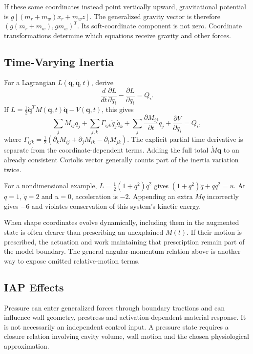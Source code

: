If these same coordinates instead point vertically upward, gravitational potential is $g[(m_r+m_w)x_r+m_wz]$. The generalized gravity vector is therefore $(g(m_r+m_w),gm_w)^T$. Its soft-coordinate component is not zero. Coordinate transformations determine which equations receive gravity and other forces.

\subsection{Time-Varying Inertia}

For a Lagrangian $L(\mathbf q,\dot{\mathbf q},t)$, derive
\[
\frac{d}{dt}\frac{\partial L}{\partial\dot q_i}
-\frac{\partial L}{\partial q_i}=Q_i.
\]
If $L=\tfrac12\dot{\mathbf q}^TM(\mathbf q,t)\dot{\mathbf q}-V(\mathbf q,t)$, this gives
\[
\sum_j M_{ij}\ddot q_j
+\sum_{j,k}\Gamma_{ijk}\dot q_j\dot q_k
+\sum_j\frac{\partial M_{ij}}{\partial t}\dot q_j
+\frac{\partial V}{\partial q_i}=Q_i,
\]
where $\Gamma_{ijk}=\tfrac12(\partial_kM_{ij}+\partial_jM_{ik}-\partial_iM_{jk})$. The explicit partial time derivative is separate from the coordinate-dependent terms. Adding the full total $\dot M\dot{\mathbf q}$ to an already consistent Coriolis vector generally counts part of the inertia variation twice.

For a nondimensional example, $L=\tfrac12(1+q^2)\dot q^2$ gives $(1+q^2)\ddot q+q\dot q^2=u$. At $q=1$, $\dot q=2$ and $u=0$, acceleration is $-2$. Appending an extra $\dot M\dot q$ incorrectly gives $-6$ and violates conservation of this system's kinetic energy.

When shape coordinates evolve dynamically, including them in the augmented state is often clearer than prescribing an unexplained $M(t)$. If their motion is prescribed, the actuation and work maintaining that prescription remain part of the model boundary. The general angular-momentum relation above is another way to expose omitted relative-motion terms.

\subsection{IAP Effects}

Pressure can enter generalized forces through boundary tractions and can influence wall geometry, prestress and activation-dependent material response. It is not necessarily an independent control input. A pressure state requires a closure relation involving cavity volume, wall motion and the chosen physiological approximation.

